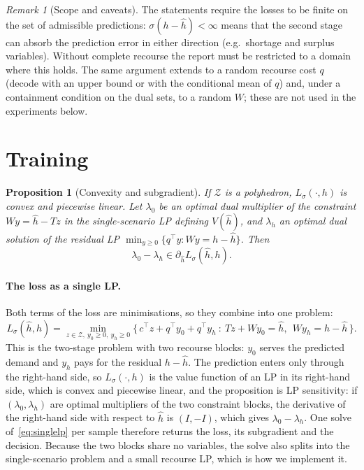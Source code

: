 \documentclass[11pt,a4paper]{article}
\newtheorem{proposition}[theorem]{Proposition}
\theoremstyle{remark}
\newtheorem{remark}[theorem]{Remark}
\newcommand{\Z}{\mathcal Z}
\newcommand{\hh}{\hat h}
\newcommand{\Ls}{L_\sigma}
\begin{document}
\begin{remark}[Scope and caveats]
The statements require the losses to be finite on the set of admissible
predictions: $\sigma(h-\hh)<\infty$ means that the second stage can absorb the
prediction error in either direction (e.g.\ shortage and surplus variables).
Without complete recourse the report must be restricted to a domain where
this holds. The same argument extends to a random recourse cost $q$ (decode
with an upper bound or with the conditional mean of $q$) and, under a
containment condition on the dual sets, to a random $W$; these are not used in
the experiments below.
\end{remark}

\section{Training}\label{sec:training}

\begin{proposition}[Convexity and subgradient]
If $\Z$ is a polyhedron, $\Ls(\cdot,h)$ is convex and piecewise linear. Let
$\lambda_0$ be an optimal dual multiplier of the constraint $Wy=\hh-Tz$ in the
single-scenario LP defining $V(\hh)$, and $\lambda_h$ an optimal dual
solution of the residual LP $\min_{y\ge0}\{q^\top y:Wy=h-\hh\}$. Then
\[
 \lambda_0-\lambda_h\in\partial_{\hh}\Ls(\hh,h).
\]
\end{proposition}

\paragraph{The loss as a single LP.}
Both terms of the loss are minimisations, so they combine into one problem:
\begin{equation}\label{eq:singlelp}
 \Ls(\hh,h)=\min_{z\in\Z,\ y_0\ge0,\ y_h\ge0}
 \bigl\{\,c^\top z+q^\top y_0+q^\top y_h\ :\ Tz+Wy_0=\hh,\ \ Wy_h=h-\hh\,\bigr\}.
\end{equation}
This is the two-stage problem with two recourse blocks: $y_0$ serves the
predicted demand and $y_h$ pays for the residual $h-\hh$. The prediction enters
only through the right-hand side, so $\Ls(\cdot,h)$ is the value function of an
LP in its right-hand side, which is convex and piecewise linear, and the
proposition is LP sensitivity: if $(\lambda_0,\lambda_h)$ are optimal
multipliers of the two constraint blocks, the derivative of the right-hand side
with respect to $\hh$ is $(I,-I)$, which gives $\lambda_0-\lambda_h$. One solve
of~\eqref{eq:singlelp} per sample therefore returns the loss, its subgradient
and the decision. Because the two blocks share no variables, the solve also
splits into the single-scenario problem and a small recourse LP, which is how
we implement it.
\end{document}
